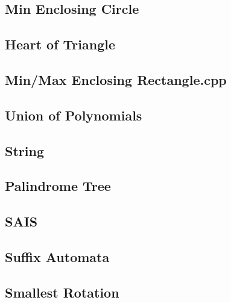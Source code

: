 \documentclass[a4paper,10pt,twocolumn,oneside]{article}
\begin{document}
\subsection{Min Enclosing Circle}

\subsection{Heart of Triangle}

\subsection{Min/Max Enclosing Rectangle.cpp}

\subsection{Union of Polynomials}


\subsection{String}
\subsection{Palindrome Tree}

\subsection{SAIS}

\subsection{Suffix Automata}

\subsection{Smallest Rotation}

\end{document}
